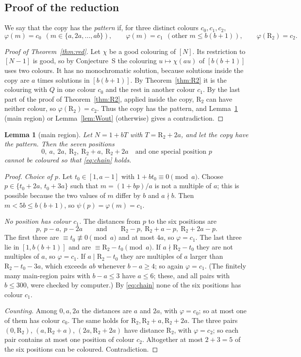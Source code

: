 \documentclass[11pt,a4paper]{article}
\newtheorem{lemma}[theorem]{Lemma}
\theoremstyle{definition}
\theoremstyle{remark}
\newcommand{\R}{\mathrm{R}}
\begin{document}
\subsection{Proof of the reduction}
We say that the copy has the \emph{pattern} if, for three distinct colours $c_0,c_1,c_2$,
\[
  \varphi(m)=c_0\ \ (m\in\{a,2a,\dots,ab\}),\qquad
  \varphi(m)=c_1\ \ (\text{other } m\le b(b+1)),\qquad
  \varphi(\R_2)=c_2 .
\]

\begin{proof}[Proof of Theorem~\ref{thm:red}]
Let $\chi$ be a good colouring of $[N]$. Its restriction to $[N-1]$ is good, so by Conjecture~S the colouring $u\mapsto\chi(au)$ of $[b(b+1)]$ uses two colours. It has no monochromatic solution, because solutions inside the copy are $a$ times solutions in $[b(b+1)]$. By Theorem~\ref{thm:R2} it is the colouring with $Q$ in one colour $c_0$ and the rest in another colour $c_1$. By the last part of the proof of Theorem~\ref{thm:R2}, applied inside the copy, $\R_2$ can have neither colour, so $\varphi(\R_2)=c_2$. Thus the copy has the pattern, and Lemma~\ref{lem:W} (main region) or Lemma~\ref{lem:Wout} (otherwise) gives a contradiction.
\end{proof}

\begin{lemma}[main region]\label{lem:W}
Let $N=1+bT$ with $T=\R_2+2a$, and let the copy have the pattern. Then the seven positions
\[
  0,\ a,\ 2a,\ \R_2,\ \R_2+a,\ \R_2+2a\quad\text{and one special position $p$}
\]
cannot be coloured so that \eqref{eq:chain} holds.
\end{lemma}
\begin{proof}
\emph{Choice of $p$.} Let $t_0\in[1,a-1]$ with $1+bt_0\equiv0\pmod a$. Choose $p\in\{t_0+2a,\,t_0+3a\}$ such that $m=(1+bp)/a$ is not a multiple of $a$; this is possible because the two values of $m$ differ by $b$ and $a\nmid b$. Then $m<5b\le b(b+1)$, so $\psi(p)=\varphi(m)=c_1$.

\emph{No position has colour $c_1$.} The distances from $p$ to the six positions are
\[
  p,\ p-a,\ p-2a\qquad\text{and}\qquad \R_2-p,\ \R_2+a-p,\ \R_2+2a-p .
\]
The first three are $\equiv t_0\not\equiv0\pmod a$ and at most $4a$, so $\varphi=c_1$. The last three lie in $[1,b(b+1)]$ and are $\equiv\R_2-t_0\pmod a$. If $a\nmid\R_2-t_0$ they are not multiples of $a$, so $\varphi=c_1$. If $a\mid\R_2-t_0$ they are multiples of $a$ larger than $\R_2-t_0-3a$, which exceeds $ab$ whenever $b-a\ge4$; so again $\varphi=c_1$. (The finitely many main-region pairs with $b-a\le3$ have $a\le6$; these, and all pairs with $b\le300$, were checked by computer.) By \eqref{eq:chain} none of the six positions has colour $c_1$.

\emph{Counting.} Among $0,a,2a$ the distances are $a$ and $2a$, with $\varphi=c_0$; so at most one of them has colour $c_0$. The same holds for $\R_2,\R_2+a,\R_2+2a$. The three pairs $(0,\R_2)$, $(a,\R_2+a)$, $(2a,\R_2+2a)$ have distance $\R_2$, with $\varphi=c_2$; so each pair contains at most one position of colour $c_2$. Altogether at most $2+3=5$ of the six positions can be coloured. Contradiction.
\end{proof}
\end{document}

